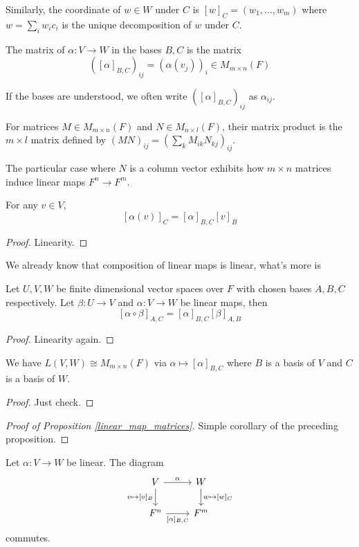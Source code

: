 Similarly, the coordinate of $w\in W$ under $C$ is $[w]_C=(w_1,\ldots,w_m)$ where $w=\sum_{i}w_ic_i$ is the unique decomposition of $w$ under $C$.
\begin{definition}
    The matrix of $\alpha:V\to W$ in the bases $B,C$ is the matrix
    $$([\alpha]_{B,C})_{ij}=(\alpha(v_j))_i\in M_{m\times n}(F)$$
\end{definition}
If the bases are understood, we often write $([\alpha]_{B,C})_{ij}$ as $\alpha_{ij}$.
\begin{definition}
    For matrices $M\in M_{m\times n}(F)$ and $N\in M_{n\times l}(F)$, their matrix product is the $m\times l$ matrix defined by $(MN)_{ij}=(\sum_kM_{ik}N_{kj})_{ij}$.
\end{definition}
The particular case where $N$ is a column vector exhibits how $m\times n$ matrices induce linear maps $F^n\to F^m$.
\begin{lemma}
    For any $v\in V$,
    $$[\alpha(v)]_C=[\alpha]_{B,C}[v]_B$$
\end{lemma}
\begin{proof}
    Linearity.
\end{proof}
We already know that composition of linear maps is linear, what's more is
\begin{lemma}
    Let $U,V,W$ be finite dimensional vector spaces over $F$ with chosen bases $A,B,C$ respectively.
    Let $\beta:U\to V$ and $\alpha:V\to W$ be linear maps, then
    $$[\alpha\circ\beta]_{A,C}=[\alpha]_{B,C}[\beta]_{A,B}$$
\end{lemma}
\begin{proof}
    Linearity again.
\end{proof}
\begin{proposition}
    We have $L(V,W)\cong M_{m\times n}(F)$ via $\alpha\mapsto[\alpha]_{B,C}$ where $B$ is a basis of $V$ and $C$ is a basis of $W$.
\end{proposition}
\begin{proof}
    Just check.
\end{proof}
\begin{proof}[Proof of Proposition \ref{linear_map_matrices}]
    Simple corollary of the preceding proposition.
\end{proof}
\begin{remark}
    Let $\alpha:V\to W$ be linear.
    The diagram
    \[
        \begin{tikzcd}
            V\arrow{r}{\alpha}\arrow[swap]{d}{v\mapsto [v]_B}&W\arrow{d}{w\mapsto [w]_C}\\
            F^n\arrow[swap]{r}{[\alpha]_{B,C}}&F^m
        \end{tikzcd}
    \]
    commutes.
\end{remark}
